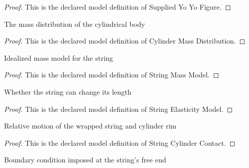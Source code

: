 \begin{proof}
  This is the declared model definition of Supplied Yo Yo Figure.
\end{proof}
\begin{definition}
  \label{def:physics:phyx-mini-0824:phyxminiproblems-problemphyxmini0824-cylindermassdistribution}
  The mass distribution of the cylindrical body
\end{definition}
\begin{proof}
  This is the declared model definition of Cylinder Mass Distribution.
\end{proof}
\begin{definition}
  \label{def:physics:phyx-mini-0824:phyxminiproblems-problemphyxmini0824-stringmassmodel}
  Idealized mass model for the string
\end{definition}
\begin{proof}
  This is the declared model definition of String Mass Model.
\end{proof}
\begin{definition}
  \label{def:physics:phyx-mini-0824:phyxminiproblems-problemphyxmini0824-stringelasticitymodel}
  Whether the string can change its length
\end{definition}
\begin{proof}
  This is the declared model definition of String Elasticity Model.
\end{proof}
\begin{definition}
  \label{def:physics:phyx-mini-0824:phyxminiproblems-problemphyxmini0824-stringcylindercontact}
  Relative motion of the wrapped string and cylinder rim
\end{definition}
\begin{proof}
  This is the declared model definition of String Cylinder Contact.
\end{proof}
\begin{definition}
  \label{def:physics:phyx-mini-0824:phyxminiproblems-problemphyxmini0824-freeendcondition}
  Boundary condition imposed at the string's free end
\end{definition}
